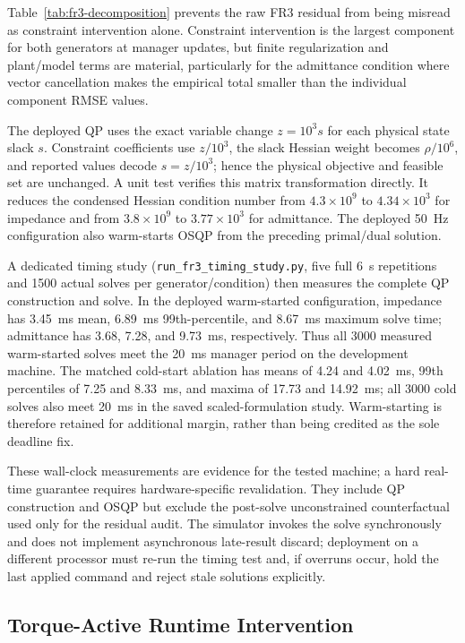 \documentclass[journal]{IEEEtran}
\begin{document}
Table~\ref{tab:fr3-decomposition} prevents the raw FR3 residual from being
misread as constraint intervention alone. Constraint intervention is the
largest component for both generators at manager updates, but finite
regularization and plant/model terms are material, particularly for the
admittance condition where vector cancellation makes the empirical total
smaller than the individual component RMSE values.

The deployed QP uses the exact variable change $z=10^3s$ for each physical
state slack $s$. Constraint coefficients use $z/10^3$, the slack Hessian
weight becomes $\rho/10^6$, and reported values decode $s=z/10^3$; hence
the physical objective and feasible set are unchanged. A unit test verifies
this matrix transformation directly. It reduces the condensed Hessian
condition number from $4.3\times10^9$ to $4.34\times10^3$ for impedance and
from $3.8\times10^9$ to $3.77\times10^3$ for admittance. The deployed 50~Hz
configuration also warm-starts OSQP from the preceding primal/dual solution.

A dedicated timing study (\texttt{run\_fr3\_timing\_study.py}, five full
6~s repetitions and 1500 actual solves per generator/condition) then measures
the complete QP construction and solve. In the deployed warm-started
configuration, impedance has 3.45~ms mean, 6.89~ms 99th-percentile, and
8.67~ms maximum solve time; admittance has 3.68, 7.28, and 9.73~ms,
respectively. Thus all 3000 measured warm-started solves meet the 20~ms
manager period on the development machine. The matched cold-start ablation
has means of 4.24 and 4.02~ms, 99th percentiles of 7.25 and 8.33~ms, and
maxima of 17.73 and 14.92~ms; all 3000 cold solves also meet 20~ms in the
saved scaled-formulation study. Warm-starting is therefore retained for
additional margin, rather than being credited as the sole deadline fix.

These wall-clock measurements are evidence for the tested machine; a hard
real-time guarantee requires hardware-specific revalidation. They include QP construction
and OSQP but exclude the post-solve unconstrained counterfactual used only for
the residual audit. The simulator invokes the solve synchronously and does
not implement asynchronous late-result discard; deployment on a different
processor must re-run the timing test and, if overruns occur, hold the last
applied command and reject stale solutions explicitly.

\subsection{Torque-Active Runtime Intervention}
\label{sec:torque-activation}
\end{document}
